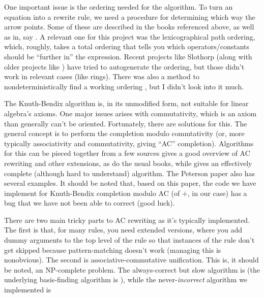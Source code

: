 \documentclass[12pt,letterpaper]{article}
\begin{document}
One important issue is the ordering needed for the algorithm.
To turn an equation into a rewrite rule, we need a procedure for determining which way the arrow points.
Some of these are described in the books referenced above, as well as in, say \cite{Dershowitz1987}.
A relevant one for this project was the lexicographical path ordering, which, roughly, takes a total ordering that tells you which operators/constants should be ``further in'' the expression.
Recent projects like Slothorp\cite{Wehrman2006} (along with older projects like \cite{Dick1990}) have tried to autogenerate the ordering, but those didn't work in relevant cases (like rings).
There was also a method to nondeterministically find a working ordering \cite{Plaisted}, but I didn't look into it much.

The Knuth-Bendix algorithm is, in its unmodified form, not suitable for linear algebra's axioms.
One major issues arises with commutativity, which is an axiom than generally can't be oriented.
Fortunately, there are solutions for this.
The general concept is to perform the completion modulo commtativity (or, more typically associativity and commutativity, giving ``AC'' completion).
Algorithms for this can be pieced together from a few sources \cite{Bachmair1991} gives a good overview of AC rewriting and other extensions, as do the usual books, while \cite{Peterson1981} gives an effectively complete (although hard to understand) algorithm.
The Peterson paper \cite{Peterson1981} also has several examples.
It should be noted that, based on this paper, the code we have implement for Knuth-Bendix completion modulo AC (of $+$, in our case) has a bug that we have not been able to correct (good luck).

There are two main tricky parts to AC rewriting as it's typically implemented.
The first is that, for many rules, you need extended versions, where you add dummy arguments to the top level of the rule so that instances of the rule don't get skipped because pattern-matching doesn't work (managing this is nonobvious). The second is associative-commutative unification. This is, it should be noted, an NP-complete problem. The always-correct but slow algorithm is \cite{Stickel} (the underlying basis-finding algorithm is \cite{Lankford1989}), while the never-\emph{incorrect} algorithm we implemented is \cite{Lincoln1989}
\end{document}
